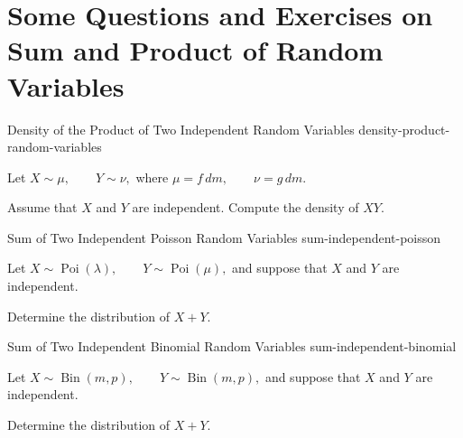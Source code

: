 \section{Some Questions and Exercises on Sum and Product of Random Variables}


\begin{question}{Density of the Product of Two Independent Random Variables}
{density-product-random-variables}

Let
\(
X\sim\mu,
\qquad
Y\sim\nu,
\)
where
\(
\mu=f\,dm,
\qquad
\nu=g\,dm.
\)

Assume that $X$ and $Y$ are independent.
Compute the density of
\(
XY.
\)

\end{question}


\begin{question}{Sum of Two Independent Poisson Random Variables}
{sum-independent-poisson}

Let
\(
X\sim\operatorname{Poi}(\lambda),
\qquad
Y\sim\operatorname{Poi}(\mu),
\)
and suppose that $X$ and $Y$ are independent.

Determine the distribution of
\(
X+Y.
\)

\end{question}


\begin{question}{Sum of Two Independent Binomial Random Variables}
{sum-independent-binomial}

Let
\(
X\sim\operatorname{Bin}(m,p),
\qquad
Y\sim\operatorname{Bin}(m,p),
\)
and suppose that $X$ and $Y$ are independent.

Determine the distribution of
\(
X+Y.
\)

\end{question}



